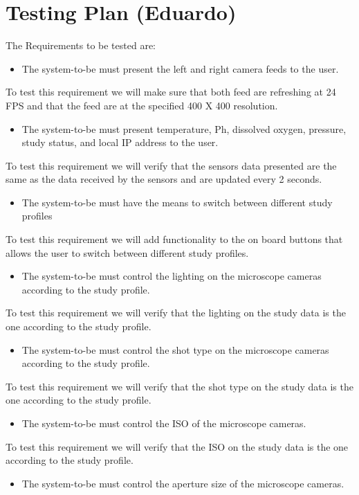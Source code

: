 \section{Testing Plan (Eduardo)}
The Requirements to be tested are:
\begin{itemize}
    \item The system-to-be must present the left and right camera feeds to the user.
\end{itemize}
To test this requirement we will make sure that both feed are refreshing at 24 FPS and that the feed are at the specified 400 X 400 resolution.
\begin{itemize}
    \item The system-to-be must present temperature, Ph, dissolved oxygen, pressure, study status, and local IP address to the user.
\end{itemize}
To test this requirement we will verify that the sensors data presented are the same as the data received by the sensors and are updated every 2 seconds.
\begin{itemize}
    \item The system-to-be must have the means to switch between different study profiles
\end{itemize}
To test this requirement we will add functionality to the on board buttons that allows the user to switch between different study profiles.
\begin{itemize}
    \item The system-to-be must control the lighting on the microscope cameras according to the study profile.
\end{itemize}
To test this requirement we will verify that the lighting on the study data is the one according to the study profile.
\begin{itemize}
    \item The system-to-be must control the shot type on the microscope cameras according to the study profile.
\end{itemize}
To test this requirement we will verify that the shot type on the study data is the one according to the study profile.
\begin{itemize}
    \item The system-to-be must control the ISO of the microscope cameras.
\end{itemize}
To test this requirement we will verify that the ISO on the study data is the one according to the study profile.
\begin{itemize}
    \item The system-to-be must control the aperture size of the microscope cameras.
\end{itemize}
